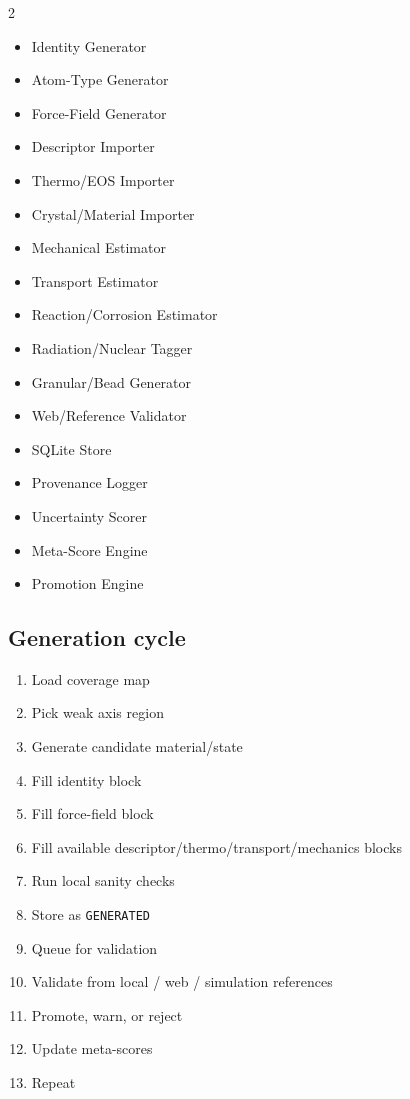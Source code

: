 \documentclass[11pt, a4paper]{article}
\begin{document}
\begin{multicols}{2}
\begin{itemize}[itemsep=1pt, leftmargin=*]
  \item Identity Generator
  \item Atom-Type Generator
  \item Force-Field Generator
  \item Descriptor Importer
  \item Thermo/EOS Importer
  \item Crystal/Material Importer
  \item Mechanical Estimator
  \item Transport Estimator
  \item Reaction/Corrosion Estimator
  \item Radiation/Nuclear Tagger
  \item Granular/Bead Generator
  \item Web/Reference Validator
  \item SQLite Store
  \item Provenance Logger
  \item Uncertainty Scorer
  \item Meta-Score Engine
  \item Promotion Engine
\end{itemize}
\end{multicols}

\subsection{Generation cycle}

\begin{enumerate}[leftmargin=*, itemsep=2pt]
  \item Load coverage map
  \item Pick weak axis region
  \item Generate candidate material/state
  \item Fill identity block
  \item Fill force-field block
  \item Fill available descriptor/thermo/transport/mechanics blocks
  \item Run local sanity checks
  \item Store as \texttt{GENERATED}
  \item Queue for validation
  \item Validate from local / web / simulation references
  \item Promote, warn, or reject
  \item Update meta-scores
  \item Repeat
\end{enumerate}
\end{document}
